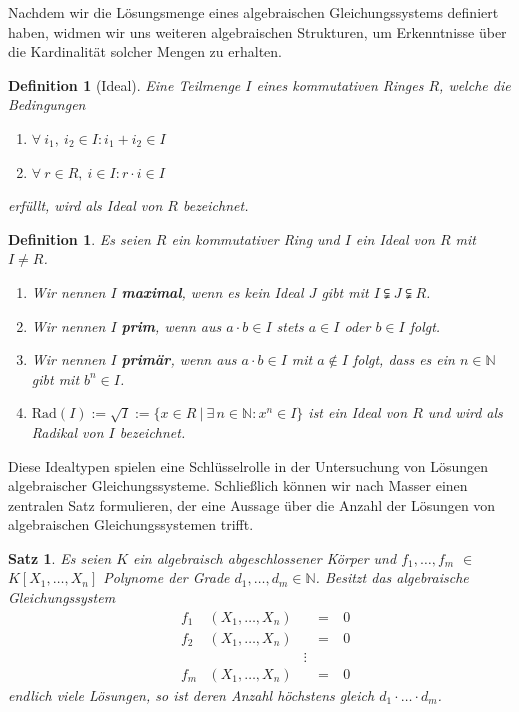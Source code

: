 \documentclass[a4paper,oneside, 11pt, openany%
]{article}
\newcommand{\N}{{\mathbb N}}
\newcommand{\coloneqq}{:=}
\theoremstyle{custom}
\newtheorem{proposition}[theorem]{Satz}
\theoremstyle{custom}
\newtheorem{definition}[theorem]{Definition}
\begin{document}
	Nachdem wir die Lösungsmenge eines algebraischen Gleichungssystems definiert haben, widmen wir uns weiteren algebraischen Strukturen, um Erkenntnisse über die Kardinalität solcher Mengen zu erhalten.
	\begin{definition}[Ideal]
		Eine Teilmenge $I$ eines kommutativen Ringes $R$, welche die Bedingungen
		\begin{enumerate}
			\item $\forall \ i_1,\ i_2 \in I \colon i_1+i_2 \in I$  
			\item $\forall \ r \in R,\ i \in I \colon r \cdot i \in I$	
		\end{enumerate}
		erfüllt, wird als Ideal von $R$ bezeichnet.
	\end{definition}
	\begin{definition}
		Es seien $R$ ein kommutativer Ring und $I$ ein Ideal von $R$ mit $I \neq R$.
		\begin{enumerate}
			\item Wir nennen $I$ \textbf{maximal}, wenn es kein Ideal $J$ gibt mit $I \subsetneqq J \subsetneqq R$.
			\item Wir nennen $I$ \textbf{prim}, wenn aus $a\cdot b \in I$ stets $a \in I$ oder $b \in I$ folgt.
			\item Wir nennen $I$ \textbf{primär}, wenn aus $a\cdot b \in I$ mit $a \not\in I$ folgt, dass es ein $n \in \N$ gibt mit $b^n \in I$.
			\item $\text{Rad}(I) \coloneqq \sqrt{I} \coloneqq \{x \in R \ \left| \  \exists \, n \in \N \colon x^n \in I\right.\}$ ist ein Ideal von $R$ und wird als Radikal von $I$ bezeichnet.
		\end{enumerate}
	\end{definition}
	Diese Idealtypen spielen eine Schlüsselrolle in der Untersuchung von Lösungen algebraischer Gleichungssysteme.
	Schließlich können wir nach Masser \cite{masser1983fields} einen zentralen Satz formulieren, der eine Aussage über die Anzahl der Lösungen von algebraischen Gleichungssystemen trifft.
	\begin{proposition}\label{prop:bezout}
		Es seien $K$ ein algebraisch abgeschlossener Körper und $f_1,\ldots,f_m$ $\in$ \newline $K[X_1,\ldots,X_n]$ Polynome der Grade $d_1,\ldots,d_m \in \N$. Besitzt das algebraische Gleichungssystem
		\begin{equation*}
			\begin{alignedat}{5}
				&f_{1}&\left(X_{1}, \ldots, X_{n} \right)& \ &=\ &0\\
				&f_{2}&\left(X_{1}, \ldots, X_{n} \right)& \ &=\ &0\\
				&&&  \vdots& &\\
				&f_{m}&\left(X_{1}, \ldots, X_{n} \right)& \ &=\ &0
			\end{alignedat}
		\end{equation*}
		endlich viele Lösungen, so ist deren Anzahl höchstens gleich $d_1 \cdot \ldots \cdot d_m$.
	\end{proposition}
\end{document}
